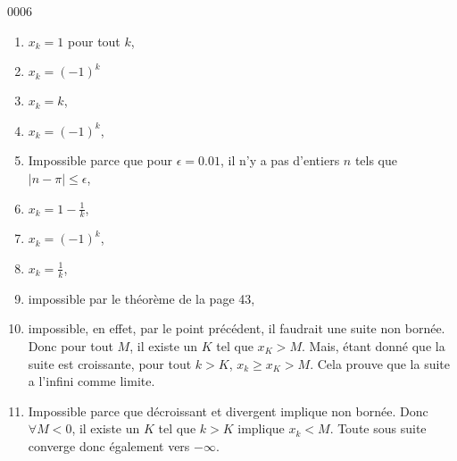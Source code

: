 
\begin{corrige}{0006}

\begin{enumerate}
\item $x_k=1$ pour tout $k$,
\item $x_k=(-1)^k$
\item $x_k=k$,
\item $x_k=(-1)^k$,
\item Impossible parce que pour $\epsilon=0.01$, il n'y a pas d'entiers $n$ tels que $| n-\pi |\leq\epsilon$,
\item $x_k=1-\frac{1}{ k }$,
\item $x_k=(-1)^k$,
\item $x_k=\frac{1}{ k }$,
\item impossible par le théorème de la page 43,
\item impossible, en effet, par le point précédent, il faudrait une suite non bornée. Donc pour tout $M$, il existe un $K$ tel que $x_K>M$. Mais, étant donné que la suite est croissante, pour tout $k>K$, $x_k\geq x_K>M$. Cela prouve que la suite a l'infini comme limite.
\item Impossible parce que décroissant et divergent implique non bornée. Donc $\forall M<0$, il existe un $K$ tel que $k>K$ implique $x_k<M$. Toute sous suite \og converge\fg{}  donc également vers $-\infty$.
\end{enumerate}


\end{corrige}
